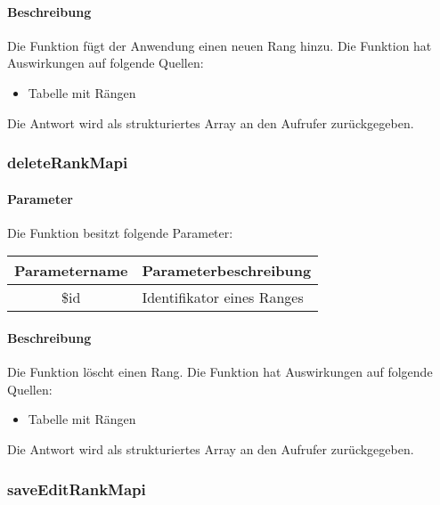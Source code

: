 \paragraph{Beschreibung} Die Funktion fügt der Anwendung einen neuen Rang hinzu. Die Funktion hat Auswirkungen auf folgende Quellen:
\begin{itemize}
	\item Tabelle mit Rängen
\end{itemize}
Die Antwort wird als strukturiertes Array an den Aufrufer zurückgegeben.
\subsubsection{deleteRankMapi}
\paragraph{Parameter} Die Funktion besitzt folgende Parameter:
\begin{table}[H]
	\begin{tabular}{|c|p{11cm}|}
		\hline
		\textbf{Parametername} & \textbf{Parameterbeschreibung} \\ \hline
		\$id & Identifikator eines Ranges \\ \hline
	\end{tabular}
\end{table}
\paragraph{Beschreibung} Die Funktion löscht einen Rang. Die Funktion hat Auswirkungen auf folgende Quellen:
\begin{itemize}
	\item Tabelle mit Rängen
\end{itemize}
Die Antwort wird als strukturiertes Array an den Aufrufer zurückgegeben.
\subsubsection{saveEditRankMapi}
